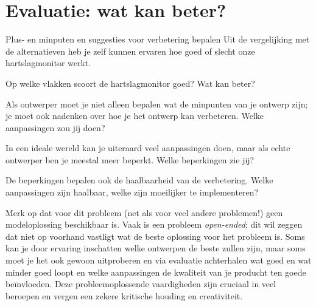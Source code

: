 \section{Evaluatie: wat kan beter?}
\label{sec:Mod6_Sec3}
%
\begin{opdracht}{Plus- en minputen en suggesties voor verbetering bepalen}
	Uit de vergelijking met de alternatieven heb je zelf kunnen ervaren hoe goed of slecht onze hartslagmonitor werkt. 

\begin{steroef}
	Op welke vlakken scoort de hartslagmonitor goed?
Wat kan beter? 
\end{steroef}

\begin{steroef}
	Als ontwerper moet je niet alleen bepalen wat de minpunten van je ontwerp zijn; je moet ook nadenken over hoe je het ontwerp kan verbeteren. Welke aanpassingen zou jij doen?
\end{steroef}

\begin{steroef}
	In een ideale wereld kan je uiteraard veel aanpassingen doen, maar als echte ontwerper ben je meestal meer beperkt. Welke beperkingen zie jij? 
\end{steroef}

\begin{steroef}
	De beperkingen bepalen ook de haalbaarheid van de verbetering. Welke aanpassingen zijn haalbaar, welke zijn moeilijker te implementeren?
\end{steroef}

\begin{opmerking}
	Merk op dat voor dit probleem (net als voor veel andere problemen!) geen modeloplossing beschikbaar is. Vaak is een probleem \emph{open-ended}; dit wil zeggen dat niet op voorhand vastligt wat de beste oplossing voor het probleem is. Soms kan je door ervaring inschatten welke ontwerpen de beste zullen zijn, maar soms moet je het ook gewoon uitproberen en via evaluatie achterhalen wat goed en wat minder goed loopt en welke aanpassingen de kwaliteit van je producht ten goede be\"invloeden. Deze probleemoplossende vaardigheden zijn cruciaal in veel beroepen en vergen een zekere kritische houding en creativiteit.
\end{opmerking}
\end{opdracht}
